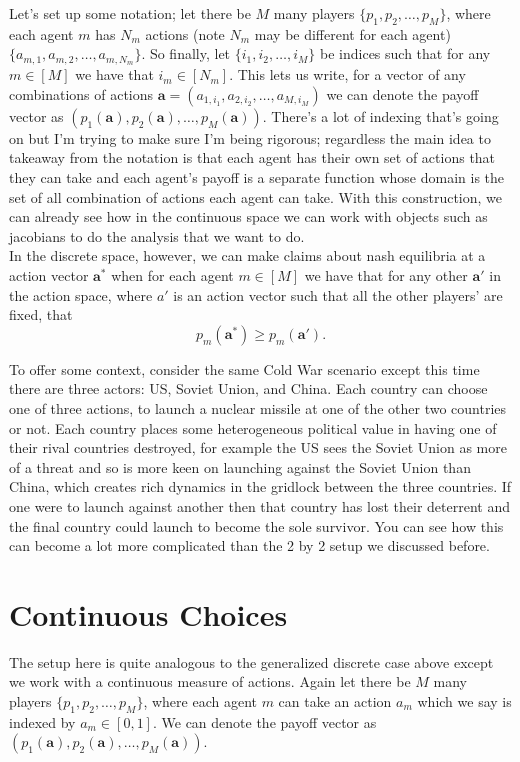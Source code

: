 \documentclass[11pt,english]{article}
\begin{document}
\noindent Let's set up some notation; let there be $M$ many players $\{p_1, p_2, \ldots, p_M\}$, where each agent $m$ has $N_m$ actions (note $N_m$ may be different for each agent) $\{a_{m,1}, a_{m,2}, \ldots, a_{m,N_m}\}$. So finally, let $\{i_1, i_2, \ldots, i_M\}$ be indices such that for any $m\in [M]$ we have that $i_m\in [N_m]$. This lets us write, for a vector of any combinations of actions $\mathbf{a} = (a_{1,i_1}, a_{2, i_2}, \ldots, a_{M, i_M})$ we can denote the payoff vector as $(p_1(\mathbf{a}), p_2(\mathbf{a}), \ldots, p_M(\mathbf{a}))$. There's a lot of indexing that's going on but I'm trying to make sure I'm being rigorous; regardless the main idea to takeaway from the notation is that each agent has their own set of actions that they can take and each agent's payoff is a separate function whose domain is the set of all combination of actions each agent can take. With this construction, we can already see how in the continuous space we can work with objects such as jacobians to do the analysis that we want to do.\\

\noindent In the discrete space, however, we can make claims about nash equilibria at a action vector $\mathbf{a^*}$ when for each agent $m\in [M]$ we have that for any other $\mathbf{a'}$ in the action space, where $a'$ is an action vector such that all the other players' are fixed, that $$p_m(\mathbf{a^*}) \geq p_m(\mathbf{a'}).$$

\noindent To offer some context, consider the same Cold War scenario except this time there are three actors: US, Soviet Union, and China. Each country can choose one of three actions, to launch a nuclear missile at one of the other two countries or not. Each country places some heterogeneous political value in having one of their rival countries destroyed, for example the US sees the Soviet Union as more of a threat and so is more keen on launching against the Soviet Union than China, which creates rich dynamics in the gridlock between the three countries. If one were to launch against another then that country has lost their deterrent and the final country could launch to become the sole survivor. You can see how this can become a lot more complicated than the 2 by 2 setup we discussed before.
\section*{Continuous Choices}

The setup here is quite analogous to the generalized discrete case above except we work with a continuous measure of actions. Again let there be $M$ many players $\{p_1, p_2, \ldots, p_M\}$, where each agent $m$ can take an action $a_m$ which we say is indexed by $a_m\in [0,1]$. We can denote the payoff vector as $(p_1(\mathbf{a}), p_2(\mathbf{a}), \ldots, p_M(\mathbf{a}))$.
\end{document}

